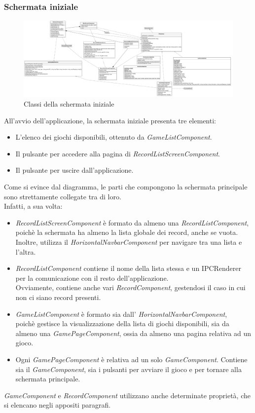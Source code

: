 \subsubsection{Schermata iniziale}
\begin{figure}[h]
    \centering
    \includegraphics[width=340pt]{images/prog/MainScreen.png}
    \caption{Classi della schermata iniziale}
    \label{fig:schermataIniziale}
\end{figure}
All'avvio dell'applicazione, la schermata iniziale presenta tre elementi:
\begin{itemize}
    \item L'elenco dei giochi disponibili, ottenuto da \emph{GameListComponent}.
    \item Il pulsante per accedere alla pagina di \emph{RecordListScreenComponent}.
    \item Il pulsante per uscire dall'applicazione.
\end{itemize}
Come si evince dal diagramma, le parti che compongono la schermata principale sono strettamente collegate tra di loro.\\
Infatti, a sua volta:
\begin{itemize}
    \item \emph{RecordListScreenComponent} è formato da almeno una \emph{RecordListComponent}, poichè la schermata ha almeno la lista globale dei record, anche se vuota. Inoltre, utilizza il \emph{HorizontalNavbarComponent} per navigare tra una lista e l'altra.
    \item \emph{RecordListComponent} contiene il nome della lista stessa e un IPCRenderer per la comunicazione con il resto dell'applicazione.\\ Ovviamente, contiene anche vari \emph{RecordComponent}, gestendosi il caso in cui non ci siano record presenti.
    \item \emph{GameListComponent} è formato sia dall' \emph{HorizontalNavbarComponent},\\ poichè gestisce la visualizzazione della lista di giochi disponibili, sia da almeno una \emph{GamePageComponent}, ossia da almeno una pagina relativa ad un gioco.
    \item Ogni \emph{GamePageComponent} è relativa ad un solo \emph{GameComponent}. Contiene sia il \emph{GameComponent}, sia i pulsanti per avviare il gioco e per tornare alla schermata principale.
\end{itemize}
\emph{GameComponent} e \emph{RecordComponent} utilizzano anche determinate proprietà, che si elencano negli appositi paragrafi.
